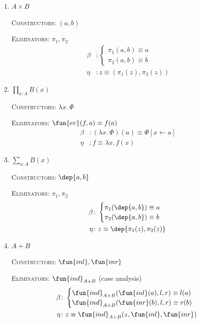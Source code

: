 \begin{enumerate}[-]
    \item $A\times B$
    
    \textsc{Constructors:} $(a,b)$
    
    \textsc{Eliminators:} $\pi_1, \pi_2$
    \begin{align*}
        \beta & \colon \begin{cases}
            \pi_1(a,b) \equiv a \\
            \pi_2(a,b) \equiv b
        \end{cases} \\
        \eta & \colon z \equiv (\pi_1(z), \pi_2(z))
    \end{align*}

    \item $\prod_{x:A} B(x)$
    
    \textsc{Constructors:} $\lambda x.\,\Phi$
    
    \textsc{Eliminators:} $\fun{ev}(f,a)\equiv f(a)$
    \begin{align*}
        \beta&\colon(\lambda x.\,\Phi)(a)\equiv\Phi[x\leftarrow a]\\
        \eta & \colon f \equiv \lambda x.\, f(x)
    \end{align*}

    \item $\sum_{x:A}B(x)$
    
    \textsc{Constructors:} $\dep{a,b}$
    
    \textsc{Eliminators:} $\pi_1, \pi_2$
    \begin{align*}
        \beta&\colon\begin{cases}
            \pi_1(\dep{a,b})\equiv a\\
            \pi_2(\dep{a,b})\equiv b
        \end{cases}\\
        \eta&\colon z\equiv\dep{\pi_1(z),\pi_2(z)}
    \end{align*}

    \item $A+B$
    
    \textsc{Constructors:} $\fun{inl},\fun{inr}$
    
    \textsc{Eliminators:} $\fun{ind}_{A+B}$ (case analysis)
    \begin{align*}
        \beta&\colon \begin{cases}
            \fun{ind}_{A+B}(\fun{inl}(a),l,r) \equiv l(a)\\
            \fun{ind}_{A+B}(\fun{inr}(b),l,r) \equiv r(b)
        \end{cases}\\
        \eta&\colon z\equiv\fun{ind}_{A+B}(z,\fun{inl},\fun{inr})
    \end{align*}


\end{enumerate}
